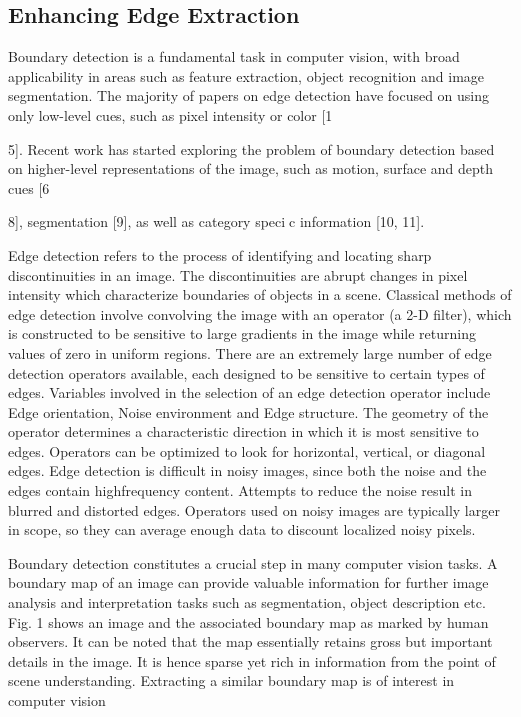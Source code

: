 \subsection{Enhancing Edge Extraction}
Boundary detection is a fundamental task in computer vision, with broad applicability 
in areas such as feature extraction, object recognition and image segmentation. 
The majority of papers on edge detection have focused on using only
low-level cues, such as pixel intensity or color [1{5]. Recent work has started exploring 
the problem of boundary detection based on higher-level representations
of the image, such as motion, surface and depth cues [6{8], segmentation [9], as
well as category specic information [10, 11].

Edge detection refers to the process of identifying and locating sharp discontinuities in an image. The 
discontinuities are abrupt changes in pixel intensity which characterize boundaries of objects in a scene.
Classical methods of edge detection involve convolving the image with an operator (a 2-D filter), which is
constructed to be sensitive to large gradients in the image while returning values of zero in uniform regions.
There are an extremely large number of edge detection operators available, each designed to be sensitive to 
certain types of edges. Variables involved in the selection of an edge detection operator include Edge
orientation, Noise environment and Edge structure. The geometry of the operator determines a characteristic 
direction in which it is most sensitive to edges. Operators can be optimized to look for horizontal, vertical, or 
diagonal edges. Edge detection is difficult in noisy images, since both the noise and the edges contain highfrequency 
content. Attempts to reduce the noise result in blurred and distorted edges. Operators used on noisy 
images are typically larger in scope, so they can average enough data to discount localized noisy pixels.

Boundary detection constitutes a crucial step in many computer vision tasks. A
boundary map of an image can provide valuable information for further image
analysis and interpretation tasks such as segmentation, object description etc.
Fig. 1 shows an image and the associated boundary map as marked by human
observers. It can be noted that the map essentially retains gross but important
details in the image. It is hence sparse yet rich in information from the point
of scene understanding. Extracting a similar boundary map is of interest in
computer vision

}}
